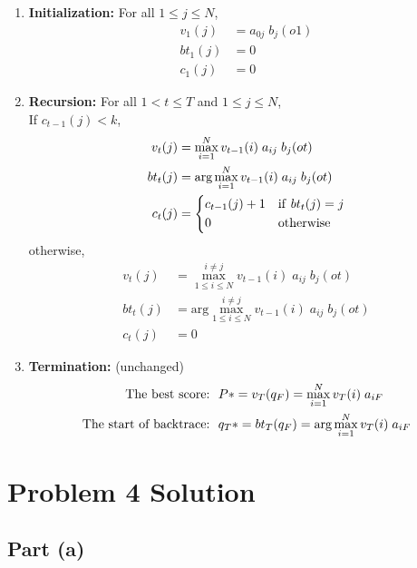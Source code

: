 \documentclass[11pt,a4paper,titlepage]{article}
\begin{document}
\begin{enumerate}
    \item \textbf{Initialization:} For all $1 \le j \le N$,
        \begin{align*}
            v_1(j) &= a_{0j} \; b_j(o1) \\
            bt_1(j) &= 0 \\
            c_1(j) &= 0
        \end{align*}
    \item \textbf{Recursion:} For all $1 < t \le T$ and $1 \le j \le N$,\\
        If $c_{t-1}(j) < k$,
        \begin{align*}
            v_t(j) &= \max_{i=1}^{N} v_{t-1}(i) \; a_{ij} \; b_j(ot) \\
            bt_t(j) &= \textrm{arg}\max_{i=1}^{N} v_{t-1}(i) \; a_{ij} \; b_j(ot) \\
            c_t(j) &=
            \begin{dcases}
                c_{t-1}(j) + 1 & {\rm if~} bt_t(j) = j \\
                0 & {\rm otherwise} \\
            \end{dcases}
        \end{align*}
        otherwise,
        \begin{align*}
            v_t(j) &= \max_{1 \le i \le N}^{i \ne j} v_{t-1}(i) \; a_{ij} \; b_j(ot) \\
            bt_t(j) &= \textrm{arg}\max_{1 \le i \le N}^{i \ne j} v_{t-1}(i) \; a_{ij} \; b_j(ot) \\
            c_t(j) &= 0
        \end{align*}
    \item \textbf{Termination:} (unchanged)
        \begin{align*}
            \textrm{The best score:}&~~ P* = v_T(q_F) = \max_{i=1}^N v_T(i) \; a_{iF} \\
            \textrm{The start of backtrace:}&~~ q_T* = bt_T(q_F) = {\rm arg}\max_{i=1}^N v_T(i) \; a_{iF}
        \end{align*}
\end{enumerate}


\section*{Problem 4 Solution}
\subsection*{Part (a)}
\end{document}
